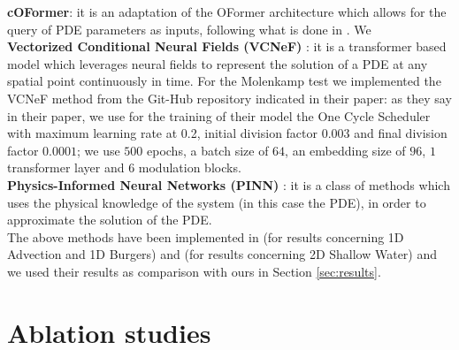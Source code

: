 \textbf{cOFormer}: it is an adaptation of the OFormer architecture which allows for the query of PDE parameters as inputs, following what is done in \cite{takamoto2022pdebench}. We 
\\
\textbf{Vectorized Conditional Neural Fields (VCNeF)} \cite{vcnef-hagnberger:2024}: it is a transformer based model which leverages neural fields to represent the solution of a PDE at any spatial point continuously in time. For the Molenkamp test we implemented the VCNeF method from the Git-Hub repository indicated in their paper: as they say in their paper, we use for the training of their model the One Cycle Scheduler with maximum learning rate at 0.2, initial division factor $0.003$ and final division factor $0.0001$; we use $500$ epochs, a batch size of $64$, an embedding size of $96$, $1$ transformer layer and $6$ modulation blocks. 
\label{sec:methods_comparison}
\\
\textbf{Physics-Informed Neural Networks (PINN)} \cite{pinns}: it is a class of methods which uses the physical knowledge of the system (in this case the PDE), in order to approximate the solution of the PDE. 
\\
The above methods have been implemented in \cite{vcnef-hagnberger:2024} (for results concerning 1D Advection and 1D Burgers) and \cite{takamoto2022pdebench} (for results concerning 2D Shallow Water) and we used their results as comparison with ours in Section \ref{sec:results}. 
\section{Ablation studies}
